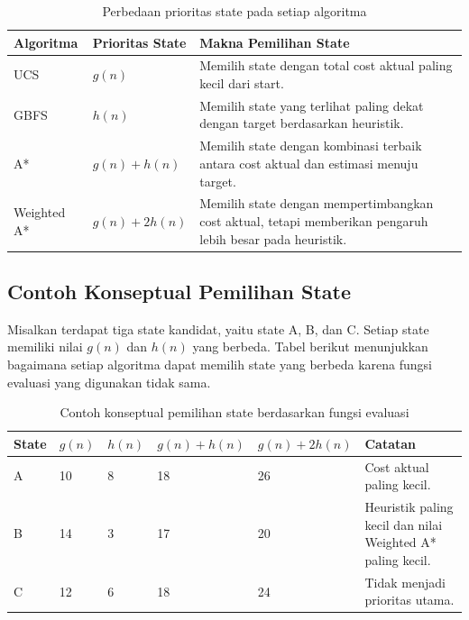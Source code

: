 \begin{table}[H]
	\centering
	\caption{Perbedaan prioritas state pada setiap algoritma}
	\begin{tabular}{|p{3cm}|p{4cm}|p{7cm}|}
		\hline
		\rowcolor{blue!15}
		\textbf{Algoritma} & \textbf{Prioritas State} & \textbf{Makna Pemilihan State} \\
		\hline
		UCS & $g(n)$ & Memilih state dengan total cost aktual paling kecil dari start. \\
		\hline
		GBFS & $h(n)$ & Memilih state yang terlihat paling dekat dengan target berdasarkan heuristik. \\
		\hline
		A* & $g(n)+h(n)$ & Memilih state dengan kombinasi terbaik antara cost aktual dan estimasi menuju target. \\
		\hline
		Weighted A* & $g(n)+2h(n)$ & Memilih state dengan mempertimbangkan cost aktual, tetapi memberikan pengaruh lebih besar pada heuristik. \\
		\hline
	\end{tabular}
\end{table}

\subsection{Contoh Konseptual Pemilihan State}

Misalkan terdapat tiga state kandidat, yaitu state A, B, dan C. 
Setiap state memiliki nilai $g(n)$ dan $h(n)$ yang berbeda. 
Tabel berikut menunjukkan bagaimana setiap algoritma dapat memilih state yang berbeda karena fungsi evaluasi yang digunakan tidak sama.

\begin{table}[H]
	\centering
	\caption{Contoh konseptual pemilihan state berdasarkan fungsi evaluasi}
	\small
	\begin{tabular}{|p{1.8cm}|p{2cm}|p{2cm}|p{2.5cm}|p{3cm}|p{2.8cm}|}
		\hline
		\rowcolor{blue!15}
		\textbf{State} & \textbf{$g(n)$} & \textbf{$h(n)$} & \textbf{$g(n)+h(n)$} & \textbf{$g(n)+2h(n)$} & \textbf{Catatan} \\
		\hline
		A & 10 & 8 & 18 & 26 & Cost aktual paling kecil. \\
		\hline
		B & 14 & 3 & 17 & 20 & Heuristik paling kecil dan nilai Weighted A* paling kecil. \\
		\hline
		C & 12 & 6 & 18 & 24 & Tidak menjadi prioritas utama. \\
		\hline
	\end{tabular}
\end{table}

